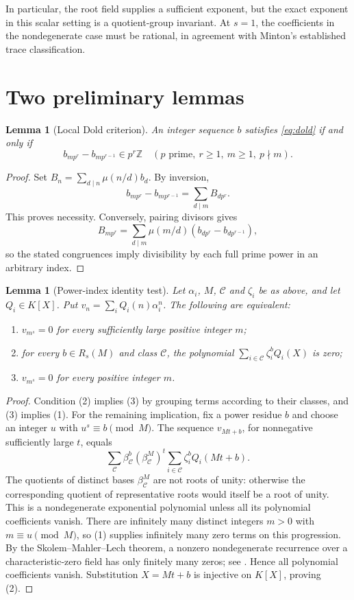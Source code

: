 \documentclass[11pt]{article}
\newtheorem{lemma}[theorem]{Lemma}
\theoremstyle{definition}
\theoremstyle{remark}
\newcommand{\Z}{\mathbb Z}
\begin{document}
In particular, the root field supplies a sufficient exponent, but the exact exponent in this scalar setting is a quotient-group invariant. At $s=1$, the coefficients in the nondegenerate case must be rational, in agreement with Minton's established trace classification.

\section{Two preliminary lemmas}
\begin{lemma}[Local Dold criterion]\label{lem:local}
An integer sequence $b$ satisfies \eqref{eq:dold} if and only if
\[
 b_{mp^r}-b_{mp^{r-1}}\in p^r\Z
 \quad(p\text{ prime},\ r\geq1,\ m\geq1,\ p\nmid m).
\]
\end{lemma}
\begin{proof}
Set $B_n=\sum_{d\mid n}\mu(n/d)b_d$. By inversion,
\[
 b_{mp^r}-b_{mp^{r-1}}=\sum_{d\mid m}B_{dp^r}.
\]
This proves necessity. Conversely, pairing divisors gives
\[
 B_{mp^r}=\sum_{d\mid m}\mu(m/d)
       (b_{dp^r}-b_{dp^{r-1}}),
\]
so the stated congruences imply divisibility by each full prime power in an arbitrary index.
\end{proof}

\begin{lemma}[Power-index identity test]\label{lem:identity}
Let $\alpha_i$, $M$, $\mathcal C$ and $\zeta_i$ be as above, and let $Q_i\in K[X]$. Put $v_n=\sum_iQ_i(n)\alpha_i^n$. The following are equivalent:
\begin{enumerate}
\item $v_{m^s}=0$ for every sufficiently large positive integer $m$;
\item for every $b\in R_s(M)$ and class $\mathcal C$, the polynomial $\sum_{i\in\mathcal C}\zeta_i^b Q_i(X)$ is zero;
\item $v_{m^s}=0$ for every positive integer $m$.
\end{enumerate}
\end{lemma}
\begin{proof}
Condition (2) implies (3) by grouping terms according to their classes, and (3) implies (1). For the remaining implication, fix a power residue $b$ and choose an integer $u$ with $u^s\equiv b\pmod M$. The sequence $v_{Mt+b}$, for nonnegative sufficiently large $t$, equals
\[
 \sum_{\mathcal C}\beta_{\mathcal C}^{b}
  (\beta_{\mathcal C}^{M})^t
  \sum_{i\in\mathcal C}\zeta_i^bQ_i(Mt+b).
\]
The quotients of distinct bases $\beta_{\mathcal C}^M$ are not roots of unity: otherwise the corresponding quotient of representative roots would itself be a root of unity. This is a nondegenerate exponential polynomial unless all its polynomial coefficients vanish. There are infinitely many distinct integers $m>0$ with $m\equiv u\pmod M$, so (1) supplies infinitely many zero terms on this progression. By the Skolem--Mahler--Lech theorem, a nonzero nondegenerate recurrence over a characteristic-zero field has only finitely many zeros; see \cite[Theorem~1.8]{Bilu}. Hence all polynomial coefficients vanish. Substitution $X=Mt+b$ is injective on $K[X]$, proving (2).
\end{proof}
\end{document}

